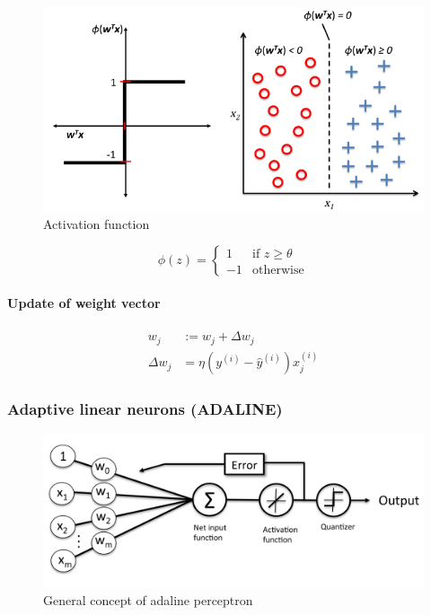\documentclass{article}
\begin{document}
			\begin{figure}
				\centering
				\includegraphics[scale=.25]{activation-function}
				\caption{Activation function}
				\label{fig:activation-function}
			\end{figure}
			
			\begin{equation*}
				\phi(z) = \begin{cases}
					1 &\mbox{if } z \geq \theta \\
					-1 &\mbox{otherwise}
				\end{cases}
			\end{equation*}
			
			\paragraph{Update of weight vector}
			
			\begin{equation*}
				\begin{aligned}
					w_j &:= w_j + \Delta w_j \\
					\Delta w_j &= \eta(y^{(i)} - \hat{y}^{(i)}) x^{(i)}_j
				\end{aligned}
			\end{equation*}

			\subsubsection{Adaptive linear neurons (ADALINE)}
			
			\begin{figure}[htpb!]
				\centering
				\includegraphics[scale=.1]{adaline-concept}
				\caption{General concept of adaline perceptron}
				\label{fig:adaline-concept}
			\end{figure}
			
\end{document}
